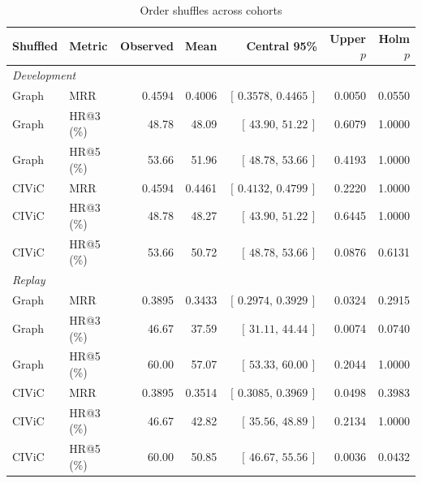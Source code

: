 \begin{table}[t]
\centering
\caption{Order shuffles across cohorts}
\label{tab:supp-shuffle}
\small
\setlength{\tabcolsep}{2.2pt}
\begin{tabular}{llrrrrr}
\toprule
Shuffled & Metric & Observed & Mean & Central 95\% & Upper $p$ & Holm $p$ \\
\midrule
\multicolumn{7}{l}{\textit{Development}} \\
Graph & MRR & 0.4594 & 0.4006 & $[\,0.3578,\,0.4465\,]$ & 0.0050 & 0.0550 \\
Graph & HR@3 (\%) & 48.78 & 48.09 & $[\,43.90,\,51.22\,]$ & 0.6079 & 1.0000 \\
Graph & HR@5 (\%) & 53.66 & 51.96 & $[\,48.78,\,53.66\,]$ & 0.4193 & 1.0000 \\
CIViC & MRR & 0.4594 & 0.4461 & $[\,0.4132,\,0.4799\,]$ & 0.2220 & 1.0000 \\
CIViC & HR@3 (\%) & 48.78 & 48.27 & $[\,43.90,\,51.22\,]$ & 0.6445 & 1.0000 \\
CIViC & HR@5 (\%) & 53.66 & 50.72 & $[\,48.78,\,53.66\,]$ & 0.0876 & 0.6131 \\
\midrule
\multicolumn{7}{l}{\textit{Replay}} \\
Graph & MRR & 0.3895 & 0.3433 & $[\,0.2974,\,0.3929\,]$ & 0.0324 & 0.2915 \\
Graph & HR@3 (\%) & 46.67 & 37.59 & $[\,31.11,\,44.44\,]$ & 0.0074 & 0.0740 \\
Graph & HR@5 (\%) & 60.00 & 57.07 & $[\,53.33,\,60.00\,]$ & 0.2044 & 1.0000 \\
CIViC & MRR & 0.3895 & 0.3514 & $[\,0.3085,\,0.3969\,]$ & 0.0498 & 0.3983 \\
CIViC & HR@3 (\%) & 46.67 & 42.82 & $[\,35.56,\,48.89\,]$ & 0.2134 & 1.0000 \\
CIViC & HR@5 (\%) & 60.00 & 50.85 & $[\,46.67,\,55.56\,]$ & 0.0036 & 0.0432 \\
\bottomrule
\end{tabular}
\end{table}
